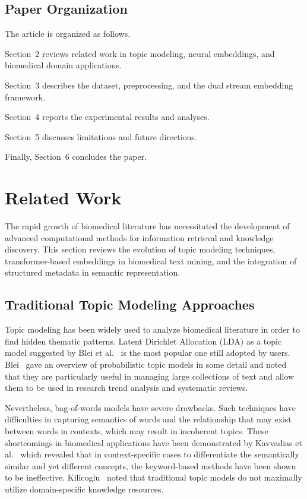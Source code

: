 \documentclass[authorproof,JACIII,researchpaper]{fujipressarticle}
\begin{document}
\subsection{Paper Organization}

The article is organized as follows.

Section~2 reviews related work in topic modeling, neural embeddings, and biomedical domain applications.

Section~3 describes the dataset, preprocessing, and the dual stream embedding framework.

Section~4 reports the experimental results and analyses.

Section~5 discusses limitations and future directions.

Finally, Section~6 concludes the paper.

\section{Related Work}

The rapid growth of biomedical literature has necessitated the development of advanced computational methods for information retrieval and knowledge discovery. This section reviews the evolution of topic modeling techniques, transformer-based embeddings in biomedical text mining, and the integration of structured metadata in semantic representation.

\subsection{Traditional Topic Modeling Approaches}

Topic modeling has been widely used to analyze biomedical literature in order to find hidden thematic patterns. Latent Dirichlet Allocation (LDA) as a topic model suggested by Blei et al.~\cite{blei_latent_2003} is the most popular one still adopted by users. Blei~\cite{blei_probabilistic_2012} gave an overview of probabilistic topic models in some detail and noted that they are particularly useful in managing large collections of text and allow them to be used in research trend analysis and systematic reviews.

Nevertheless, bag-of-words models have severe drawbacks. Such techniques have difficulties in capturing semantics of words and the relationship that may exist between words in contexts, which may result in incoherent topics. These shortcomings in biomedical applications have been demonstrated by Kavvadias et al.~\cite{kavvadias_supporting_2020} which revealed that in context-specific cases to differentiate the semantically similar and yet different concepts, the keyword-based methods have been shown to be ineffective. Kilicoglu~\cite{kilicoglu_biomedical_2018} noted that traditional topic models do not maximally utilize domain-specific knowledge resources.
\end{document}
